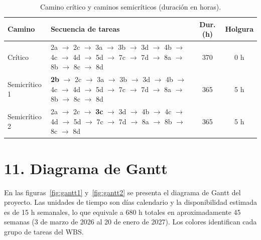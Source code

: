 \documentclass[
11pt, %
]{charter}
\begin{document}
\begin{table}[htpb]
\centering
\caption{Camino crítico y caminos semicríticos (duración en horas).}
\label{tab:caminos}
{\footnotesize
\begin{tabularx}{\linewidth}{@{}|l|X|c|c|@{}}
\hline
\rowcolor[HTML]{C0C0C0}
Camino & Secuencia de tareas & Dur. (h) & Holgura \\ \hline
Crítico       & 2a $\to$ 2c $\to$ 3a $\to$ 3b $\to$ 3d $\to$ 4b $\to$ 4c $\to$ 4d $\to$ 5d $\to$ 7c $\to$ 7d $\to$ 8a $\to$ 8b $\to$ 8c $\to$ 8d & 370 & 0 h \\ \hline
Semicrítico 1 & \textbf{2b} $\to$ 2c $\to$ 3a $\to$ 3b $\to$ 3d $\to$ 4b $\to$ 4c $\to$ 4d $\to$ 5d $\to$ 7c $\to$ 7d $\to$ 8a $\to$ 8b $\to$ 8c $\to$ 8d & 365 & 5 h \\ \hline
Semicrítico 2 & 2a $\to$ 2c $\to$ \textbf{3c} $\to$ 3d $\to$ 4b $\to$ 4c $\to$ 4d $\to$ 5d $\to$ 7c $\to$ 7d $\to$ 8a $\to$ 8b $\to$ 8c $\to$ 8d & 365 & 5 h \\ \hline
\end{tabularx}
}
\end{table}

\section{11. Diagrama de Gantt}
\label{sec:gantt}

En las figuras~\ref{fig:gantt1} y~\ref{fig:gantt2} se presenta el diagrama de Gantt del proyecto. Las unidades de tiempo son días calendario y la disponibilidad estimada es de 15 h semanales, lo que equivale a 680 h totales en aproximadamente 45 semanas (3 de marzo de 2026 al 20 de enero de 2027). Los colores identifican cada grupo de tareas del WBS.
\end{document}
